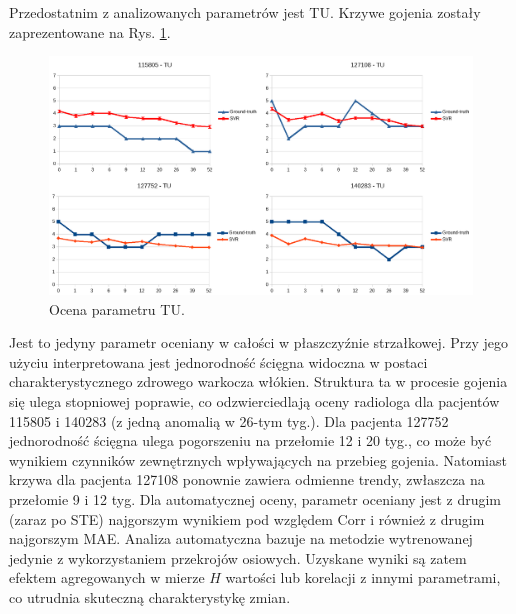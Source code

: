 Przedostatnim z analizowanych parametrów jest TU. Krzywe gojenia zostały zaprezentowane na Rys. \ref{fig:TU}.  
\begin{figure}[h!]
	\centering
	\includegraphics[width=1\textwidth]{figures/TU.png}
	\caption{Ocena parametru TU.}\label{fig:TU}
\end{figure}
Jest to jedyny parametr oceniany w całości w płaszczyźnie strzałkowej. Przy jego użyciu interpretowana jest jednorodność ścięgna widoczna w postaci charakterystycznego zdrowego warkocza włókien. Struktura ta w procesie gojenia się ulega stopniowej poprawie, co odzwierciedlają oceny radiologa dla pacjentów 115805 i 140283 (z jedną anomalią w 26-tym tyg.). Dla pacjenta 127752 jednorodność ścięgna ulega pogorszeniu na przełomie 12 i 20 tyg., co może być wynikiem czynników zewnętrznych wpływających na przebieg gojenia. Natomiast krzywa dla pacjenta 127108 ponownie zawiera odmienne trendy, zwłaszcza na przełomie 9 i 12 tyg. Dla automatycznej oceny, parametr oceniany jest z drugim (zaraz po STE) najgorszym wynikiem pod względem Corr i również z drugim najgorszym MAE. Analiza automatyczna bazuje na metodzie wytrenowanej jedynie z wykorzystaniem przekrojów osiowych. Uzyskane wyniki są zatem efektem agregowanych w mierze $H$ wartości lub korelacji z innymi parametrami, co utrudnia skuteczną charakterystykę zmian. 

